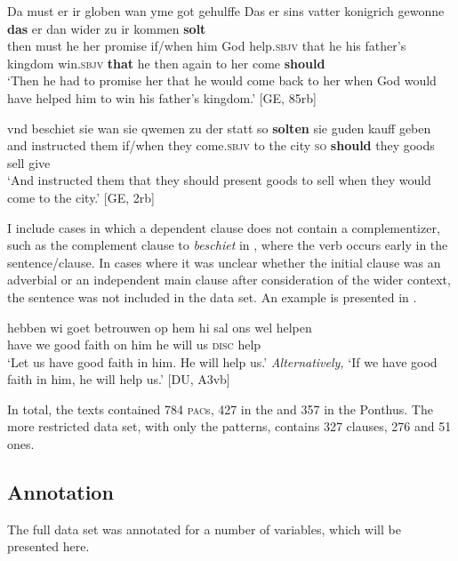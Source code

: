 \documentclass[output=paper,colorlinks,citecolor=brown]{langscibook}
\begin{document}
\ea
\ea \label{ex:compvl}
\gll Da must er ir globen wan yme got gehulffe Das er sins vatter konigrich gewonne \textbf{das} er dan wider zu ir kommen \textbf{solt}\\
then must he her promise if/when him God help.\textsc{sbjv} that he his father's kingdom win.\textsc{sbjv} \textbf{that} he then again to her come \textbf{should}\\
\glt `Then he had to promise her that he would come back to her when God would have helped him to win his father's kingdom.' \hfill [GE, 85rb]

\ex \label{ex:compv2}
\gll vnd beschiet sie wan sie qwemen zu der statt so \textbf{solten} sie guden kauff geben\\
and instructed them if/when they come.\textsc{sbjv} to the city \textsc{so} \textbf{should} they goods sell give\\
\glt `And instructed them that they should present goods to sell when they would come to the city.' \hfill [GE, 2rb]
\z
\z

I include cases in which a dependent clause does not contain a complementizer, such as the complement clause to \textit{beschiet} in , where the verb occurs early in the sentence/clause. In cases where it was unclear whether the initial clause was an adverbial or an independent main clause after consideration of the wider context, the sentence was not included in the data set. An example is presented in .

\ea \label{ex:amb}
\gll hebben wi goet betrouwen op hem hi sal ons wel helpen\\
have we good faith on him he will us \textsc{disc} help\\
\glt `Let us have good faith in him. He will help us.' \textit{Alternatively,} `If we have good faith in him, he will help us.' \hfill [DU, A3vb]
\z

In total, the texts contained 784 \textsc{pac}s, 427 in the  and 357 in the  Ponthus. The more restricted data set, with only the  patterns, contains 327 clauses, 276  and 51  ones.


\subsection{Annotation}\label{sec:3.3}
The full data set was annotated for a number of variables, which will be presented here.
\end{document}
